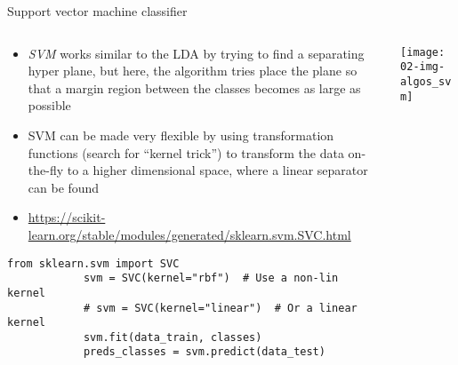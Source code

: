  \begin{frame}[fragile]{Support vector machine classifier}
    \begin{columns}
      \begin{column}{0.65\textwidth}
        \begin{itemize}
          \item \emph{SVM} works similar to the LDA by trying to find a separating hyper plane, but here, the algorithm tries place the plane so that a margin region between the classes becomes as large as possible
          \item SVM can be made very flexible by using transformation functions (search for \enquote{kernel trick}) to transform the data on-the-fly to a higher dimensional space, where a linear separator can be found
          \item \small\url{https://scikit-learn.org/stable/modules/generated/sklearn.svm.SVC.html}
        \end{itemize}
        \begin{mdframed}
          \begin{lstlisting}[style=dark, gobble=10, title=\lsttitlelight{SVM classification [Note: example shortened]}]
            from sklearn.svm import SVC
            svm = SVC(kernel="rbf")  # Use a non-lin kernel
            # svm = SVC(kernel="linear")  # Or a linear kernel
            svm.fit(data_train, classes)
            preds_classes = svm.predict(data_test)
          \end{lstlisting}
        \end{mdframed}
      \end{column}
      \begin{column}{0.35\textwidth}
        \vspace{1em}

        \texttt{[image: 02-img-algos\_svm]}
      \end{column}
    \end{columns}
  \end{frame}

